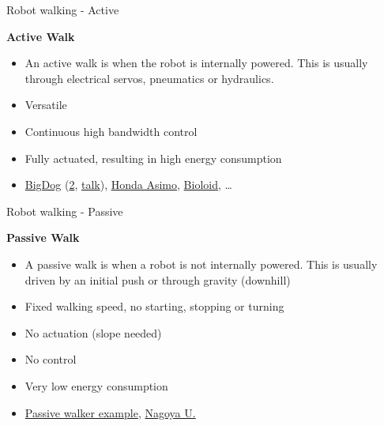 \documentclass[compress]{beamer}
\begin{document}
\begin{frame}{Robot walking - Active}

    \textbf{Active Walk}

    \begin{itemize}

        \item An active walk is when the robot is internally powered. This is
            usually through electrical servos, pneumatics or hydraulics.
        \item Versatile
        \item Continuous high bandwidth control
        \item Fully actuated, resulting in high energy consumption
        \item \href{http://www.youtube.com/watch?v=cHJJQ0zNNOM}{BigDog}
            (\href{http://www.youtube.com/watch?v=VXJZVZFRFJc}{2},
            \href{http://www.youtube.com/watch?v=-Bi-tPO0OPs}{talk}),
            \href{http://www.youtube.com/watch?v=Q3C5sc8b3xM}{Honda Asimo},
            \href{http://www.youtube.com/watch?v=KaIfZW7vCGI\&feature=related}{Bioloid},
            \ldots{}
    \end{itemize}

\end{frame}

\begin{frame}{Robot walking - Passive}

    \textbf{Passive Walk}

    \begin{itemize}

        \item A passive walk is when a robot is not internally powered. This is
            usually driven by an initial push or through gravity (downhill)
        \item Fixed walking speed, no starting, stopping or turning
        \item No actuation (slope needed)
        \item No control
        \item Very low energy consumption
        \item \href{http://www.youtube.com/watch?v=N64KOQkbyiI}{Passive walker
            example},
            \href{http://www.youtube.com/watch?v=CK8IFEGmiKY\&NR=1}{Nagoya U.}
    \end{itemize}

\end{frame}
\end{document}
